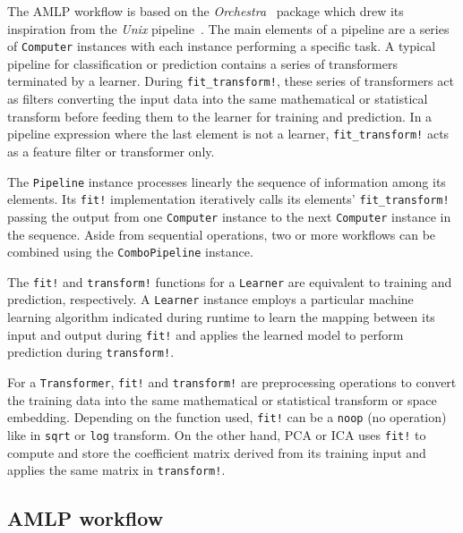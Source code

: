 \documentclass{juliacon}
\begin{document}
\vskip 6pt

The AMLP workflow is based on the \emph{Orchestra}~\cite{orchestra2014}
package which drew its inspiration from the \emph{Unix} pipeline~\cite{unix84}.
The main elements of a pipeline are a series of \texttt{Computer} instances with 
each instance performing a specific task. A typical pipeline for classification or
prediction  contains a series of transformers terminated by a learner.  During
\texttt{fit\_transform!}, these series of transformers act as filters
converting the input data into the same mathematical or statistical transform
before feeding them to the learner for training and prediction. In a pipeline
expression where the last element is not a learner, \texttt{fit\_transform!}
acts as a feature filter or transformer only.

\vskip 6pt

The \texttt{Pipeline} instance processes linearly the sequence of information
among its elements.  Its \texttt{fit!} implementation iteratively calls its
elements' \texttt{fit\_transform!} passing the output from one
\texttt{Computer} instance to the next \texttt{Computer} instance in the
sequence. Aside from sequential operations, two or more workflows can be
combined using the \texttt{ComboPipeline} instance.

\vskip 6pt

The \texttt{fit!} and \texttt{transform!} functions for a \texttt{Learner} are
equivalent to training and prediction, respectively. A \texttt{Learner}
instance employs a particular machine learning algorithm indicated during 
runtime to learn the mapping between its input and
output during \texttt{fit!}  and applies the learned model to perform
prediction during \texttt{transform!}.

\vskip 6pt

For a \texttt{Transformer}, \texttt{fit!} and \texttt{transform!} are
preprocessing operations to convert the training data into the same
mathematical or statistical transform or space embedding.  
Depending on the function used,
\texttt{fit!} can be a \texttt{noop} (no operation) like in \texttt{sqrt} or
\texttt{log} transform.  On the other hand, PCA or ICA uses \texttt{fit!} to
compute and store the coefficient matrix derived from its training input and
applies the same matrix in \texttt{transform!}.

\subsection{AMLP workflow}
\label{amlpworkflow}
\end{document}
